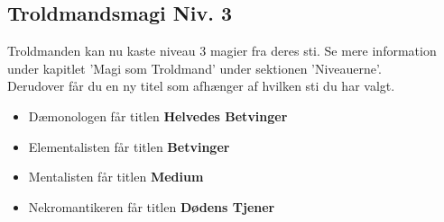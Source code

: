 \subsection*{Troldmandsmagi Niv. 3}
Troldmanden kan nu kaste niveau 3 magier fra deres sti. Se mere information under kapitlet 'Magi som Troldmand' under sektionen 'Niveauerne'. \\
Derudover får du en ny titel som afhænger af hvilken sti du har valgt.\\
\begin{itemize}
    \item Dæmonologen får titlen \textbf{Helvedes Betvinger}
    \item Elementalisten får titlen \textbf{Betvinger}
    \item Mentalisten får titlen \textbf{Medium}
    \item Nekromantikeren får titlen \textbf{Dødens Tjener}
\end{itemize}